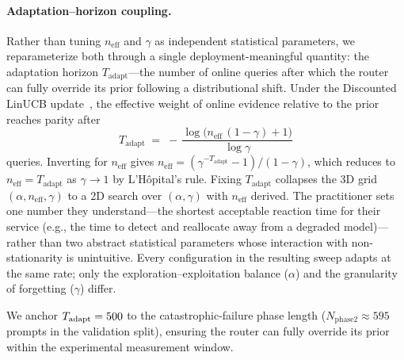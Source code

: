 \paragraph{Adaptation--horizon coupling.}
Rather than tuning $n_{\text{eff}}$ and $\gamma$ as independent
statistical parameters, we reparameterize both through a single
deployment-meaningful quantity: the adaptation horizon
$T_{\text{adapt}}$---the number of online queries after which the
router can fully override its prior following a distributional shift.
Under the Discounted LinUCB update~\cite{russac2019weighted}, the
effective weight of online evidence relative to the prior reaches
parity after
%
\begin{equation}\label{eq:t_adapt}
  T_{\text{adapt}} \;=\; -\,\frac{\log\bigl(n_{\text{eff}}\,(1{-}\gamma) + 1\bigr)}{\log \gamma}
\end{equation}
%
queries.  Inverting for $n_{\text{eff}}$ gives
$n_{\text{eff}} = (\gamma^{-T_{\text{adapt}}} - 1) / (1 - \gamma)$,
which reduces to $n_{\text{eff}} = T_{\text{adapt}}$ as
$\gamma \to 1$ by L'H\^opital's rule.
Fixing $T_{\text{adapt}}$ collapses the 3D grid
$(\alpha, n_{\text{eff}}, \gamma)$ to a 2D search over
$(\alpha, \gamma)$ with $n_{\text{eff}}$ derived.
The practitioner sets one number they understand---the shortest
acceptable reaction time for their service (e.g., the time to
detect and reallocate away from a degraded model)---rather than
two abstract statistical parameters whose interaction with
non-stationarity is unintuitive.
Every configuration in the resulting sweep adapts at the same
rate; only the exploration--exploitation balance ($\alpha$) and the
granularity of forgetting ($\gamma$) differ.

We anchor $T_{\text{adapt}} = 500$ to the catastrophic-failure
phase length ($N_{\text{phase2}} \approx 595$ prompts in the
validation split), ensuring the router can fully override its prior
within the experimental measurement window.

